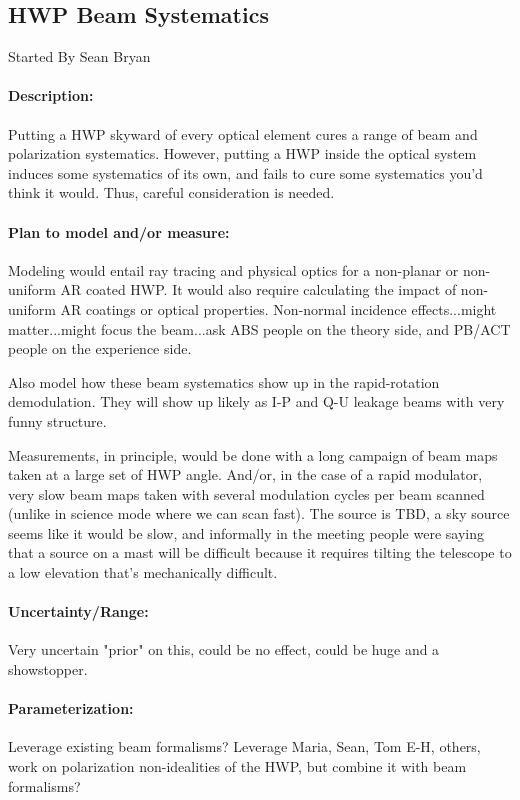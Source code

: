 
\subsection{HWP Beam Systematics}

Started By Sean Bryan

\paragraph{Description:}
Putting a HWP skyward of every optical element cures a range of beam and polarization systematics. However, putting a HWP inside the optical system induces some systematics of its own, and fails to cure some systematics you'd think it would. Thus, careful consideration is needed.

\paragraph{Plan to model and/or measure:}
Modeling would entail ray tracing and physical optics for a non-planar or non-uniform AR coated HWP. It would also require calculating the impact of non-uniform AR coatings or optical properties. Non-normal incidence effects...might matter...might focus the beam...ask ABS people on the theory side, and PB/ACT people on the experience side.

Also model how these beam systematics show up in the rapid-rotation demodulation. They will show up likely as I-P and Q-U leakage beams with very funny structure.

Measurements, in principle, would be done with a long campaign of beam maps taken at a large set of HWP angle. And/or, in the case of a rapid modulator, very slow beam maps taken with several modulation cycles per beam scanned (unlike in science mode where we can scan fast). The source is TBD, a sky source seems like it would be slow, and informally in the meeting people were saying that a source on a mast will be difficult because it requires tilting the telescope to a low elevation that's mechanically difficult.

\paragraph{Uncertainty/Range:}
Very uncertain "prior" on this, could be no effect, could be huge and a showstopper.

\paragraph{Parameterization:}

Leverage existing beam formalisms? Leverage Maria, Sean, Tom E-H, others, work on polarization non-idealities of the HWP, but combine it with beam formalisms?
